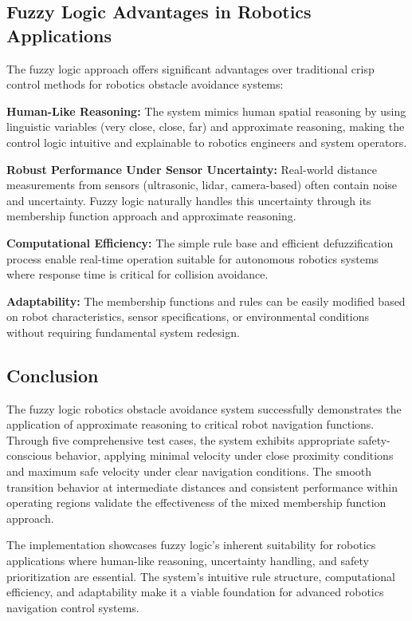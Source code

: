 \documentclass[11pt,a4paper]{article}
\begin{document}
\subsection{Fuzzy Logic Advantages in Robotics Applications}

The fuzzy logic approach offers significant advantages over traditional crisp control methods for robotics obstacle avoidance systems:

\textbf{Human-Like Reasoning:} The system mimics human spatial reasoning by using linguistic variables (very close, close, far) and approximate reasoning, making the control logic intuitive and explainable to robotics engineers and system operators.

\textbf{Robust Performance Under Sensor Uncertainty:} Real-world distance measurements from sensors (ultrasonic, lidar, camera-based) often contain noise and uncertainty. Fuzzy logic naturally handles this uncertainty through its membership function approach and approximate reasoning.

\textbf{Computational Efficiency:} The simple rule base and efficient defuzzification process enable real-time operation suitable for autonomous robotics systems where response time is critical for collision avoidance.

\textbf{Adaptability:} The membership functions and rules can be easily modified based on robot characteristics, sensor specifications, or environmental conditions without requiring fundamental system redesign.

\subsection{Conclusion}

The fuzzy logic robotics obstacle avoidance system successfully demonstrates the application of approximate reasoning to critical robot navigation functions. Through five comprehensive test cases, the system exhibits appropriate safety-conscious behavior, applying minimal velocity under close proximity conditions and maximum safe velocity under clear navigation conditions. The smooth transition behavior at intermediate distances and consistent performance within operating regions validate the effectiveness of the mixed membership function approach.

The implementation showcases fuzzy logic's inherent suitability for robotics applications where human-like reasoning, uncertainty handling, and safety prioritization are essential. The system's intuitive rule structure, computational efficiency, and adaptability make it a viable foundation for advanced robotics navigation control systems.
\end{document}
